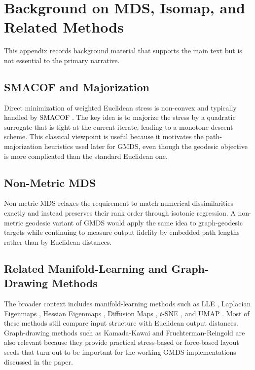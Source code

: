 \documentclass[twoside,11pt]{article}
\begin{document}
\appendix

\section{Background on MDS, Isomap, and Related Methods}
\label{app:mds_background}

This appendix records background material that supports the main text but is
not essential to the primary narrative.

\subsection{SMACOF and Majorization}
\label{sec:smacof}

Direct minimization of weighted Euclidean stress is non-convex and typically
handled by SMACOF \citep{deleeuw1977applications,deleeuw2009multidimensional}.
The key idea is to majorize the stress by a quadratic surrogate that is tight
at the current iterate, leading to a monotone descent scheme.  This classical
viewpoint is useful because it motivates the path-majorization heuristics used
later for GMDS, even though the geodesic objective is more complicated than the
standard Euclidean one.

\subsection{Non-Metric MDS}
\label{sec:nonmetric_mds}

Non-metric MDS \citep{kruskal1964nonmetric,shepard1962analysis} relaxes the
requirement to match numerical dissimilarities exactly and instead preserves
their rank order through isotonic regression.  A non-metric geodesic variant of
GMDS would apply the same idea to graph-geodesic targets while continuing to
measure output fidelity by embedded path lengths rather than by Euclidean
distances.

\subsection{Related Manifold-Learning and Graph-Drawing Methods}
\label{sec:manifold_learning}

The broader context includes manifold-learning methods such as LLE
\citep{roweis2000nonlinear}, Laplacian Eigenmaps \citep{belkin2003laplacian},
Hessian Eigenmaps \citep{donoho2003hessian}, Diffusion Maps
\citep{coifman2006diffusion}, $t$-SNE \citep{vandermaaten2008tsne}, and UMAP
\citep{mcinnes2018umap}.  Most of these methods still compare input structure
with Euclidean output distances.  Graph-drawing methods such as Kamada-Kawai
\citep{kamada1989algorithm} and Fruchterman-Reingold
\citep{fruchterman1991graph} are also relevant because they provide practical
stress-based or force-based layout seeds that turn out to be important for the
working GMDS implementations discussed in the paper.
\end{document}
